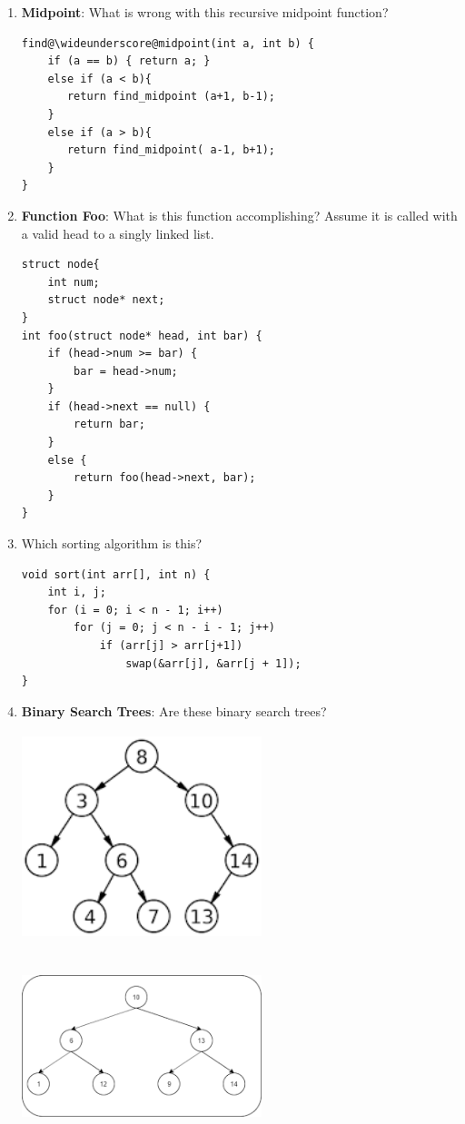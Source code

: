 \documentclass{article}
\begin{document}
\begin{enumerate}[label=(\alph*), itemsep = 120pt]
    \item \textbf{Midpoint}: What is wrong with this recursive midpoint function?
\begin{lstlisting}[style=CStyle] 
find@\wideunderscore@midpoint(int a, int b) {
    if (a == b) { return a; }
    else if (a < b){
       return find_midpoint (a+1, b-1);
    } 
    else if (a > b){
       return find_midpoint( a-1, b+1); 
    } 
}\end{lstlisting}  
    \newpage
    \item \textbf{Function Foo}: What is this function accomplishing? Assume it is called with a valid head to a singly linked list.
\begin{lstlisting}[style=CStyle] 
struct node{
    int num;
    struct node* next;
}
int foo(struct node* head, int bar) {
    if (head->num >= bar) {
        bar = head->num;
    }
    if (head->next == null) {
        return bar;
    }
    else {
        return foo(head->next, bar);
    }
}\end{lstlisting}  
    \item Which sorting algorithm is this?
\begin{lstlisting}[style=CStyle]
void sort(int arr[], int n) {
    int i, j;
    for (i = 0; i < n - 1; i++)
        for (j = 0; j < n - i - 1; j++)
            if (arr[j] > arr[j+1])
                swap(&arr[j], &arr[j + 1]);
}\end{lstlisting}

    \newpage
    \item \textbf{Binary Search Trees}: Are these binary search trees?
    
    \includegraphics[width=7cm,height=6cm]{figures/bst.png}
    \includegraphics[width=7cm,height=6cm]{figures/notbst.png}
    

\end{enumerate}
\end{document}
